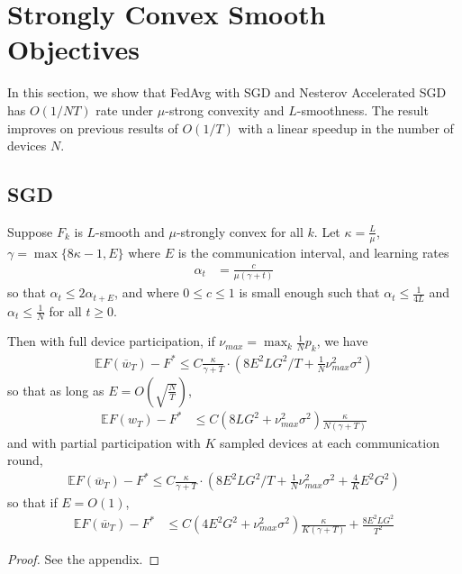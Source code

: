 


\section{Strongly Convex Smooth Objectives}

In this section, we show that FedAvg with SGD and Nesterov Accelerated SGD has $O(1/NT)$ rate under $\mu$-strong
convexity and $L$-smoothness. The result improves on previous results of
$O(1/T)$ with a linear speedup in the number of devices $N$.

\subsection{SGD}

\begin{theorem}
	Suppose $F_{k}$ is $L$-smooth and $\mu$-strongly convex for all
	$k$. Let $\kappa=\frac{L}{\mu}$, $\gamma=\max\{8\kappa-1,E\}$ where
	$E$ is the communication interval, and learning rates 
	\begin{align*}
	\alpha_{t} & =\frac{c}{\mu(\gamma+t)}
	\end{align*}
	so that $\alpha_{t}\leq2\alpha_{t+E}$, and where $0\leq c\leq1$
	is small enough such that
	$\alpha_{t} \leq\frac{1}{4L}$ and 
	$\alpha_{t} \leq\frac{1}{N}$ for all $t\geq0$. 
	
	Then with full device participation, if $\nu_{max}=\max_{k}\frac{1}{N}p_{k}$,
	we have 
	\begin{align*}
	\mathbb{E}F(\overline{w}_{T})-F^{\ast}\leq C\frac{\kappa}{\gamma+T}\cdot(8E^{2}LG^{2}/T+\frac{1}{N}\nu_{max}^{2}\sigma^{2})
	\end{align*}
	so that as long as $E=O(\sqrt{\frac{N}{T}})$, 
	\begin{align*}
	\mathbb{E}F(w_{T})-F^{\ast} & \leq C(8LG^{2}+\nu_{max}^{2}\sigma^{2})\frac{\kappa}{N(\gamma+T)}
	\end{align*}
	and with partial participation with $K$ sampled devices at each
	communication round, 
	\begin{align*}
	\mathbb{E}F(\overline{w}_{T})-F^{\ast}\leq C\frac{\kappa}{\gamma+T}\cdot(8E^{2}LG^{2}/T+\frac{1}{N}\nu_{max}^{2}\sigma^{2}+\frac{4}{K}E^{2}G^{2})
	\end{align*}
	so that if $E=O(1)$, 
	\begin{align*}
	\mathbb{E}F(\overline{w}_{T})-F^{\ast} & \leq C(4E^{2}G^{2}+\nu_{max}^{2}\sigma^{2})\frac{\kappa}{K(\gamma+T)}+\frac{8E^{2}LG^{2}}{T^{2}}
	\end{align*}
\end{theorem}
\begin{proof}
	See the appendix.
\end{proof}


